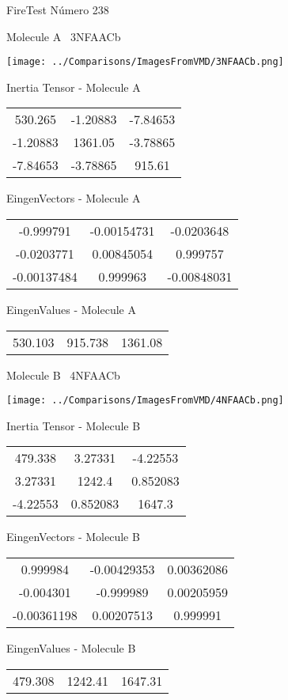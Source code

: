 \vtab[-3cm]
\begin{center}
{\large FireTest \tab Número 238}
\end{center}
\begin{multicols}{2}
\begin{center}

Molecule A \
3NFAACb

\texttt{[image: ../Comparisons/ImagesFromVMD/3NFAACb.png]}

Inertia Tensor - Molecule A \\
\begin{tabular}{|c c c|}
530.265	 & 	-1.20883	 & 	-7.84653	 \\
-1.20883	 & 	1361.05	 & 	-3.78865	 \\
-7.84653	 & 	-3.78865	 & 	915.61
\end{tabular}

\vtab
 EingenVectors - Molecule A     \\
\begin{tabular}{|c c c|}
-0.999791	 & 	-0.00154731	 & 	-0.0203648	 \\
-0.0203771	 & 	0.00845054	 & 	0.999757	 \\
-0.00137484	 & 	0.999963	 & 	-0.00848031
\end{tabular}

\vtab
 EingenValues - Molecule A     \\
\begin{tabular}{|c c c|}
530.103	 & 	915.738	 & 	1361.08	 \\
\end{tabular}
\columnbreak

Molecule B \
4NFAACb

\texttt{[image: ../Comparisons/ImagesFromVMD/4NFAACb.png]}

Inertia Tensor - Molecule B \\
\begin{tabular}{|c c c|}
479.338	 & 	3.27331	 & 	-4.22553	 \\
3.27331	 & 	1242.4	 & 	0.852083	 \\
-4.22553	 & 	0.852083	 & 	1647.3
\end{tabular}

\vtab
 EingenVectors - Molecule B     \\
\begin{tabular}{|c c c|}
0.999984	 & 	-0.00429353	 & 	0.00362086	 \\
-0.004301	 & 	-0.999989	 & 	0.00205959	 \\
-0.00361198	 & 	0.00207513	 & 	0.999991
\end{tabular}

\vtab
 EingenValues - Molecule B     \\
\begin{tabular}{|c c c|}
479.308	 & 	1242.41	 & 	1647.31	 \\
\end{tabular}

\end{center}
\end{multicols}

